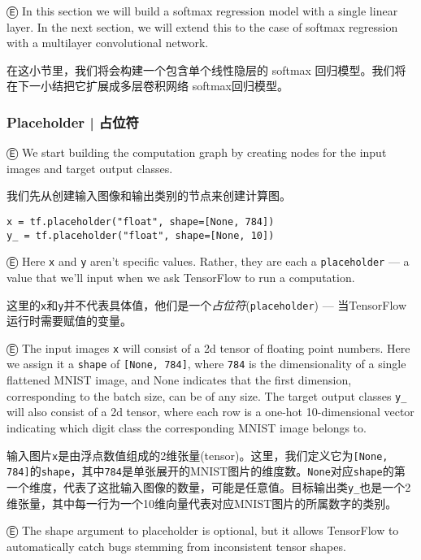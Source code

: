 Ⓔ \textcolor{etc}{In this section we will build a softmax regression model with a single linear layer. In the next section, we will extend this to the case of softmax regression with a multilayer convolutional network.}

在这小节里，我们将会构建一个包含单个线性隐层的 softmax 回归模型。我们将在下一小结把它扩展成多层卷积网络 softmax回归模型。

%
\subsubsection{Placeholder  |  占位符}

Ⓔ \textcolor{etc}{We start building the computation graph by creating nodes for the input images and target output classes.}

我们先从创建输入图像和输出类别的节点来创建计算图。

\begin{lstlisting}
x = tf.placeholder("float", shape=[None, 784])
y_ = tf.placeholder("float", shape=[None, 10])
\end{lstlisting}

Ⓔ \textcolor{etc}{Here \lstinline{x} and \lstinline{y} aren't specific values. Rather, they are each a \lstinline{placeholder} --- a value that we'll input when we ask TensorFlow to run a computation.}

这里的\lstinline{x}和\lstinline{y}并不代表具体值，他们是一个\emph{占位符}(\lstinline{placeholder}) --- 当TensorFlow运行时需要赋值的变量。

Ⓔ \textcolor{etc}{The input images \lstinline{x} will consist of a 2d tensor of floating point numbers. Here we assign it a \lstinline{shape} of \lstinline{[None, 784]}, where \lstinline{784} is the dimensionality of a single flattened MNIST image, and None indicates that the first dimension, corresponding to the batch size, can be of any size. The target output classes \lstinline{y_} will also consist of a 2d tensor, where each row is a one-hot 10-dimensional vector indicating which digit class the corresponding MNIST image belongs to.}

输入图片\lstinline{x}是由浮点数值组成的2维张量(tensor)。这里，我们定义它为\lstinline{[None, 784]}的\lstinline{shape}，其中\lstinline{784}是单张展开的MNIST图片的维度数。\lstinline{None}对应\lstinline{shape}的第一个维度，代表了这批输入图像的数量，可能是任意值。目标输出类\lstinline{y_}也是一个2维张量，其中每一行为一个10维向量代表对应MNIST图片的所属数字的类别。

Ⓔ \textcolor{etc}{The shape argument to placeholder is optional, but it allows TensorFlow to automatically catch bugs stemming from inconsistent tensor shapes.}

